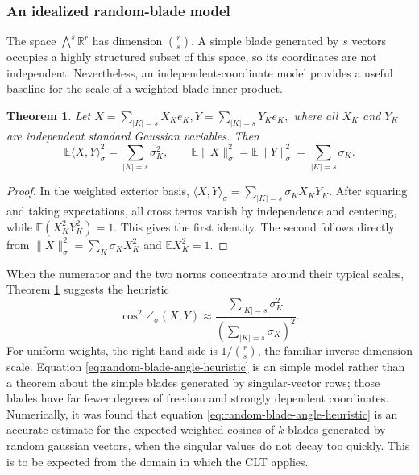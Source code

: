 \documentclass[11pt, preprint]{article}
\newtheorem{theorem}{Theorem}[section]
\newcommand{\R}{\mathbb{R}}
\newcommand{\inner}[1]{\langle #1\rangle}
\newcommand{\Exp}{\mathbb{E}}
\begin{document}
\subsubsection{An idealized random-blade model}\label{sec:k_blade_ang}

The space $\bigwedge^s\R^r$ has dimension $\binom{r}{s}$. A simple blade generated by $s$ vectors occupies a highly structured subset of this space, so its coordinates are not independent. Nevertheless, an independent-coordinate model provides a useful baseline for the scale of a weighted blade inner product.

\begin{theorem} \label{thm:k_blade_avg_inner}
Let \( X=\sum_{|K|=s}X_K e_K,  Y=\sum_{|K|=s}Y_K e_K,\) where all $X_K$ and $Y_K$ are independent standard Gaussian variables. Then
\[\Exp\inner{X,Y}_\sigma^2= \sum_{|K|=s}\sigma_K^2,
\qquad \Exp\|X\|_\sigma^2 = \Exp\|Y\|_\sigma^2=\sum_{|K|=s}\sigma_K.
\]
\end{theorem}

\begin{proof}
In the weighted exterior basis,
\(
\inner{X,Y}_\sigma=\sum_{|K|=s}\sigma_KX_KY_K.
\)
After squaring and taking expectations, all cross terms vanish by independence and centering, while
$\Exp(X_K^2Y_K^2)=1$. This gives the first identity. The second follows directly from
$\|X\|_\sigma^2=\sum_K\sigma_KX_K^2$ and $\Exp X_K^2=1$.
\end{proof}

When the numerator and the two norms concentrate around their typical scales, Theorem \ref{thm:k_blade_avg_inner} suggests the heuristic
\begin{equation}\label{eq:random-blade-angle-heuristic}
\cos^2\angle_\sigma(X,Y)
\approx
\frac{\sum_{|K|=s}\sigma_K^2}
     {\left(\sum_{|K|=s}\sigma_K\right)^2}.
\end{equation}
For uniform weights, the right-hand side is $1/\binom{r}{s}$, the familiar inverse-dimension scale. Equation \eqref{eq:random-blade-angle-heuristic} is an simple model rather than a theorem about the simple blades generated by singular-vector rows; those blades have far fewer degrees of freedom and strongly dependent coordinates. Numerically, it was found that equation \eqref{eq:random-blade-angle-heuristic} is an accurate estimate for the expected weighted cosines of $k$-blades generated by random gaussian vectors, when the singular values do not decay too quickly. This is to be expected from the domain in which the CLT applies. 
\end{document}
